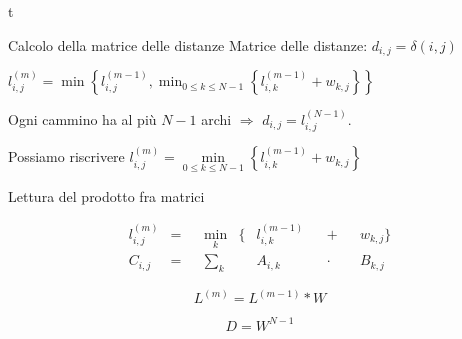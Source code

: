 t \documentclass{beamer}
\theoremstyle{plain}
\theoremstyle{definition}
\theoremstyle{remark}
\newcommand{\set}[1]{\left\{#1\right\}}
\begin{document}
\begin{frame}{Calcolo della matrice delle distanze}
  Matrice delle distanze: $d_{i,j} = \delta(i,j)$
  \vfill
  
  $l^{(m)}_{i,j} = \min\set{ l^{(m-1)} _{i,j} , \min _{0\le k\le N-1}
    \set{ l^{(m-1)} _{i,k} + w_{k,j}} }$
  
  Ogni cammino ha al pi\`u $N-1$ archi $\Rightarrow$ $d_{i,j} = l^{(N-1)}
  _{i,j}$.
  \vfill
  
  Possiamo riscrivere $l^{(m)}_{i,j} = \min \limits _{0\le k\le N-1}
  \set{ l^{(m-1)} _{i,k} + w_{k,j}}$
\end{frame}

\begin{frame}{Lettura del prodotto fra matrici}
  \begin{block}{}
    \begin{align*}
      l^{(m)}_{i,j} &=& & \min \limits _k & \Big\{ & l^{(m-1)}
      _{i,k} & & +  & & w_{k,j} \Big\} \\
      C_{i,j} &=& &\sum _k  & &  A_{i,k}  & & \cdot  & &B_{k,j} 
    \end{align*}
  \end{block}
  \pause
  
  \[ L^{(m)} = L^{(m-1)} * W \]

  \begin{block}{}
    \[ D = W^{N-1} \]
  \end{block}
\end{frame}
\end{document}
